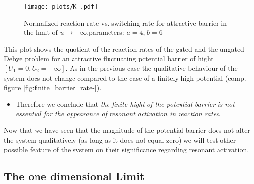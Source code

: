 \begin{minipage}[t]{0.7 \textwidth}
    \begin{figure}[H]
        \texttt{[image: plots/K-.pdf]}
    \caption{Normalized reaction rate vs. switching rate for \newline attractive barrier in the limit of $u \rightarrow - \infty$,\newline parameters: $a = 4$, $b = 6$}
    \end{figure}
\end{minipage}\begin{minipage}[t]{0.3 \textwidth}
    This plot shows the quotient of the reaction rates of the gated and the ungated Debye problem for an attractive fluctuating potential barrier of hight $[U_1 = 0, U_2 = -\infty]$. As in the previous case the qualitative behaviour of the system does not change compared to the case of a finitely high potential (comp. figure \ref{fig:finite_barrier_rate-}). 
\end{minipage}

\begin{itemize}
    \item Therefore we conclude that \textit{the finite hight of the potential barrier is not essential for the appearance of resonant activation in reaction rates}.
\end{itemize}
Now that we have seen that the magnitude of the potential barrier does not alter the system qualitatively (as long as it does not equal zero) we will test other possible feature of the system on their significance regarding resonant activation. 

\subsection{The one dimensional Limit}

